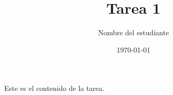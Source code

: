 \documentclass{article}
\title{Tarea 1}
\author{Nombre del estudiante}
\date{\today}
\begin{document}
\maketitle

Este es el contenido de la tarea.
\end{document}
